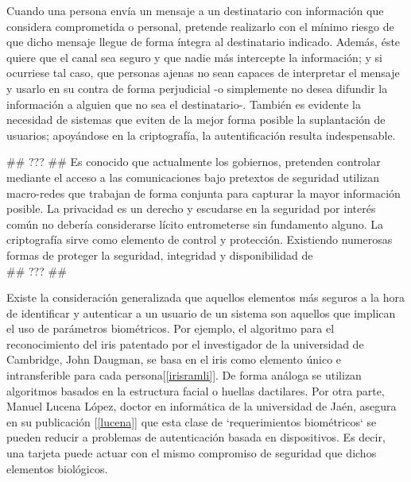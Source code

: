 \documentclass[PFC.tex]{subfiles}
\begin{document}
Cuando una persona envía un mensaje a un destinatario con información que considera comprometida o personal, pretende realizarlo con el mínimo riesgo de que dicho mensaje llegue de forma íntegra al destinatario indicado. Además, éste quiere que el canal sea seguro y que nadie más intercepte la información; y si ocurriese tal caso, que personas ajenas no sean capaces de interpretar el mensaje y usarlo en su contra de forma perjudicial -o simplemente no desea difundir la información a alguien que no sea el destinatario-. También es evidente la necesidad de sistemas que eviten de la mejor forma posible la suplantación de usuarios; apoyándose en la criptografía, la autentificación resulta indespensable.


## ??? ##
Es conocido que actualmente los gobiernos, pretenden controlar mediante el acceso a las comunicaciones bajo pretextos de seguridad utilizan macro-redes que trabajan de forma conjunta para capturar la mayor información posible.  La privacidad es un derecho y escudarse en la seguridad por interés común no debería considerarse lícito entrometerse sin fundamento alguno. La criptografía sirve como elemento de control y protección. Existiendo numerosas formas de proteger la seguridad, integridad y disponibilidad de \\
## ??? ##

Existe la consideración generalizada que aquellos elementos más seguros a la hora de identificar y autenticar a un usuario de un sistema son aquellos que implican el uso de parámetros biométricos. Por ejemplo, el algoritmo para el reconocimiento del iris patentado por el investigador de la universidad de Cambridge, John Daugman, se basa en el iris como elemento único e intransferible para cada persona[\ref{irisramli}]. De forma análoga se utilizan algoritmos basados en la estructura facial o huellas dactilares. Por otra parte, Manuel Lucena López, doctor en informática de la universidad de Jaén, asegura en su publicación [\ref{lucena}] que esta clase de `requerimientos biométricos` se pueden reducir a problemas de autenticación basada en dispositivos. Es decir, una tarjeta puede actuar con el mismo compromiso de seguridad que dichos elementos biológicos.\\
\end{document}
